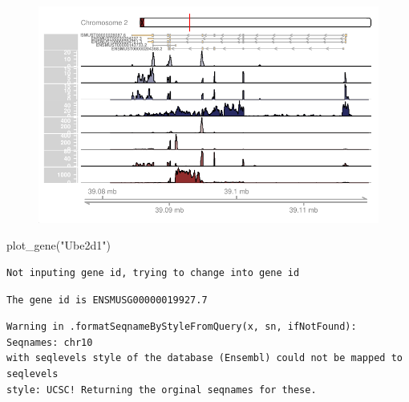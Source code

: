 \documentclass[
  letterpaper,
  DIV=11,
  numbers=noendperiod]{scrartcl}
\newenvironment{Shaded}{\begin{snugshade}}{\end{snugshade}}
\newcommand{\FunctionTok}[1]{\textcolor[rgb]{0.28,0.35,0.67}{#1}}
\newcommand{\NormalTok}[1]{\textcolor[rgb]{0.00,0.23,0.31}{#1}}
\newcommand{\StringTok}[1]{\textcolor[rgb]{0.13,0.47,0.30}{#1}}
\begin{document}
\begin{figure}[H]

{\centering \includegraphics{visualization_bw_files/figure-pdf/test_example-1.pdf}

}

\end{figure}

\begin{Shaded}
\begin{Highlighting}[]
\FunctionTok{plot\_gene}\NormalTok{(}\StringTok{"Ube2d1"}\NormalTok{)}
\end{Highlighting}
\end{Shaded}

\begin{verbatim}
Not inputing gene id, trying to change into gene id
\end{verbatim}

\begin{verbatim}
The gene id is ENSMUSG00000019927.7
\end{verbatim}

\begin{verbatim}
Warning in .formatSeqnameByStyleFromQuery(x, sn, ifNotFound): Seqnames: chr10
with seqlevels style of the database (Ensembl) could not be mapped to seqlevels
style: UCSC! Returning the orginal seqnames for these.
\end{verbatim}
\end{document}
